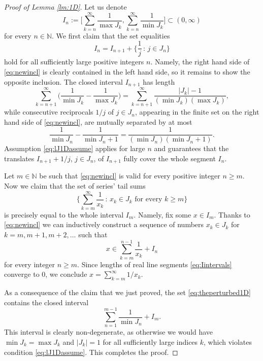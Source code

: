 \documentclass[11pt,letterpaper,reqno]{amsart}
\numberwithin{equation}{section}
\theoremstyle{definition}
\numberwithin{equation}{section}
\begin{document}
\begin{proof}[Proof of Lemma \ref{lm:1D}]
Let us denote
\begin{equation}\label{eq:Iintervals}
I_n := \biggl[ \sum_{k=n}^{\infty} \frac{1}{\max J_k} , \sum_{k=n}^{\infty} \frac{1}{\min J_k} \biggr] \subset (0,\infty)
\end{equation}
for every $n\in\mathbb{N}$.
We first claim that the set equalities
\begin{equation}\label{eq:newincl}
I_n = I_{n+1} + \biggl\{ \frac{1}{j} \,:\, j\in J_{n} \biggr\}
\end{equation}
hold for all sufficiently large positive integers $n$.
Namely, the right hand side of \eqref{eq:newincl} is clearly contained in the left hand side, so it remains to show the opposite inclusion.
The closed interval $I_{n+1}$ has length
\[ \sum_{k=n+1}^{\infty} \Big( \frac{1}{\min J_k} - \frac{1}{\max J_k} \Big)
= \sum_{k=n+1}^{\infty} \frac{|J_k|-1}{(\min J_k)(\max J_k)}, \]
while consecutive reciprocals $1/j$ of $j\in J_{n}$, appearing in the finite set on the right hand side of \eqref{eq:newincl}, are mutually separated by at most
\[ \frac{1}{\min J_{n}} - \frac{1}{\min J_{n}+1} = \frac{1}{(\min J_{n})(\min J_{n}+1)}. \]
Assumption \eqref{eq:lJ1Dassume} applies for large $n$ and guarantees that the translates $I_{n+1}+1/j$, $j\in J_{n}$, of $I_{n+1}$ fully cover the whole segment $I_n$.

Let $m\in\mathbb{N}$ be such that \eqref{eq:newincl} is valid for every positive integer $n\geqslant m$.
Now we claim that the set of series' tail sums
\[ \biggl\{ \sum_{k=m}^{\infty}\frac{1}{x_k} \,:\, x_k\in J_k \text{ for every } k\geqslant m \biggr\} \]
is precisely equal to the whole interval $I_m$.
Namely, fix some $x\in I_m$. Thanks to \eqref{eq:newincl} we can inductively construct a sequence of numbers $x_k\in J_k$ for $k=m,m+1,m+2,\ldots$ such that
\[ x \in \sum_{k=m}^{n-1}\frac{1}{x_k} + I_{n} \]
for every integer $n\geqslant m$. Since lengths of real line segments \eqref{eq:Iintervals} converge to $0$, we conclude
$x=\sum_{k=m}^{\infty}1/x_k$.

As a consequence of the claim that we just proved, the set \eqref{eq:theperturbed1D} contains the closed interval
\[ \sum_{n=1}^{m-1}\frac{1}{\min J_n} + I_m. \]
This interval is clearly non-degenerate, as otherwise we would have $\min J_k=\max J_k$ and $|J_k|=1$ for all sufficiently large indices $k$, which violates condition \eqref{eq:lJ1Dassume}. This completes the proof.
\end{proof}
\end{document}

